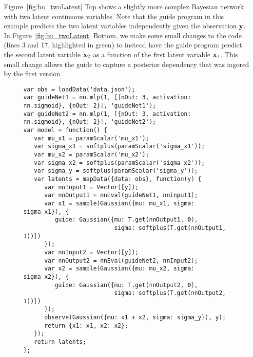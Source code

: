 Figure~\ref{fig:bn_twoLatent} Top shows a slightly more complex Bayesian network with two latent continuous variables. Note that the guide program in this example predicts the two latent variables independently given the observation $\mathbf{y}$. In Figure~\ref{fig:bn_twoLatent} Bottom, we make some small changes to the code (lines 3 and 17, highlighted in green) to instead have the guide program predict the second latent variable $\mathbf{x}_2$ as a function of the first latent variable $\mathbf{x}_1$. This small change allows the guide to capture a posterior dependency that was ingored by the first version.


\begin{figure}

\begin{minipage}{\linewidth}
\begin{minipage}{0.66\linewidth}
\begin{lstlisting}[style=smaller]
var obs = loadData('data.json');
var guideNet1 = nn.mlp(1, [{nOut: 3, activation: nn.sigmoid}, {nOut: 2}], 'guideNet1');
var guideNet2 = nn.mlp(1, [{nOut: 3, activation: nn.sigmoid}, {nOut: 2}], 'guideNet2');
var model = function() {
   var mu_x1 = paramScalar('mu_x1');
   var sigma_x1 = softplus(paramScalar('sigma_x1'));
   var mu_x2 = paramScalar('mu_x2');
   var sigma_x2 = softplus(paramScalar('sigma_x2'));
   var sigma_y = softplus(paramScalar('sigma_y'));
   var latents = mapData({data: obs}, function(y) {
      var nnInput1 = Vector([y]);
      var nnOutput1 = nnEval(guideNet1, nnInput1);
      var x1 = sample(Gaussian({mu: mu_x1, sigma: sigma_x1}), {
         guide: Gaussian({mu: T.get(nnOutput1, 0),
                          sigma: softplus(T.get(nnOutput1, 1))})
      });
      var nnInput2 = Vector([y]);
      var nnOutput2 = nnEval(guideNet2, nnInput2);
      var x2 = sample(Gaussian({mu: mu_x2, sigma: sigma_x2}), {
         guide: Gaussian({mu: T.get(nnOutput2, 0),
                          sigma: softplus(T.get(nnOutput2, 1))})
      });
      observe(Gaussian({mu: x1 + x2, sigma: sigma_y}), y);
      return {x1: x1, x2: x2};
   });
   return latents;
};
\end{lstlisting}
\end{minipage}
%
\begin{minipage}{0.33\linewidth}
\begin{flushright}
\end{flushright}
\end{minipage}
\end{minipage}
\end{figure}
